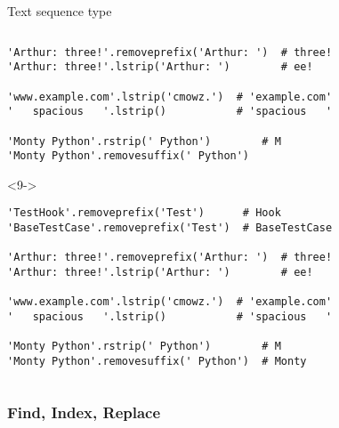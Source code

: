 \begin{frame}[fragile]{Text sequence type}
\begin{columns}[onlytextwidth]
\begin{column}{\textwidth}
\begin{onlyenv}
\begin{lstlisting}[style=python,basicstyle=\small,keepspaces=true,columns=fullflexible]
'Arthur: three!'.removeprefix('Arthur: ')  # three!
'Arthur: three!'.lstrip('Arthur: ')        # ee!

'www.example.com'.lstrip('cmowz.')  # 'example.com'
'   spacious   '.lstrip()           # 'spacious   '

'Monty Python'.rstrip(' Python')        # M
'Monty Python'.removesuffix(' Python') \end{lstlisting}
      \end{onlyenv}

      \begin{onlyenv}<9->
        \begin{lstlisting}[style=python,basicstyle=\small,keepspaces=true,columns=fullflexible]
'TestHook'.removeprefix('Test')      # Hook
'BaseTestCase'.removeprefix('Test')  # BaseTestCase

'Arthur: three!'.removeprefix('Arthur: ')  # three!
'Arthur: three!'.lstrip('Arthur: ')        # ee!

'www.example.com'.lstrip('cmowz.')  # 'example.com'
'   spacious   '.lstrip()           # 'spacious   '

'Monty Python'.rstrip(' Python')        # M
'Monty Python'.removesuffix(' Python')  # Monty \end{lstlisting}
      \end{onlyenv}

    \end{column}
  \end{columns}

\end{frame}


\subsubsection{Find, Index, Replace}

